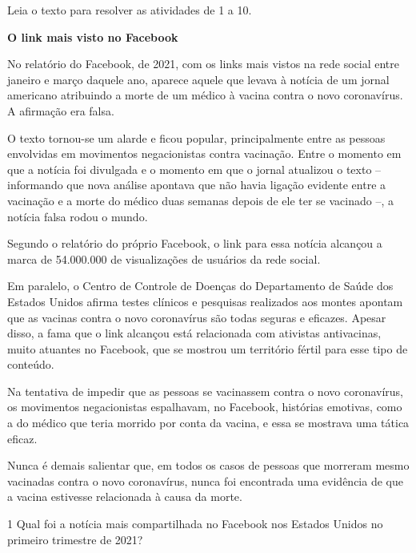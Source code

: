 Leia o texto para resolver as atividades de 1 a 10.

\begin{myquote}
\textbf{O link mais visto no Facebook}

No relatório do Facebook, de 2021, com os links mais vistos na rede social
entre janeiro e março daquele ano, aparece aquele que levava à notícia
de um jornal americano atribuindo a morte de um médico à vacina contra
o novo coronavírus. A afirmação era falsa.

O texto tornou-se um alarde e ficou popular, principalmente entre as pessoas
envolvidas em movimentos negacionistas contra vacinação. Entre o momento em
que a notícia foi divulgada e o momento em que o jornal atualizou o texto –
informando que nova análise apontava que não havia ligação evidente entre a
vacinação e a morte do médico duas semanas depois de ele ter se vacinado –,
a notícia falsa rodou o mundo.

Segundo o relatório do próprio Facebook, o link para essa notícia alcançou
a marca de 54.000.000 de visualizações de usuários da rede social.

Em paralelo, o Centro de Controle de Doenças do Departamento de Saúde dos Estados
Unidos afirma testes clínicos e pesquisas realizados aos montes apontam que as
vacinas contra o novo coronavírus são todas seguras e eficazes. Apesar disso, a
fama que o link alcançou está relacionada com ativistas antivacinas, muito atuantes
no Facebook, que se mostrou um território fértil para esse tipo de conteúdo.

Na tentativa de impedir que as pessoas se vacinassem contra o novo coronavírus,
os movimentos negacionistas espalhavam, no Facebook, histórias emotivas, como
a do médico que teria morrido por conta da vacina, e essa se mostrava uma
tática eficaz.

Nunca é demais salientar que, em todos os casos de pessoas que morreram
mesmo vacinadas contra o novo coronavírus, nunca foi encontrada uma evidência
de que a vacina estivesse relacionada à causa da morte.

\end{myquote}


\num{1} Qual foi a notícia mais compartilhada no Facebook nos Estados
Unidos no primeiro trimestre de 2021?

